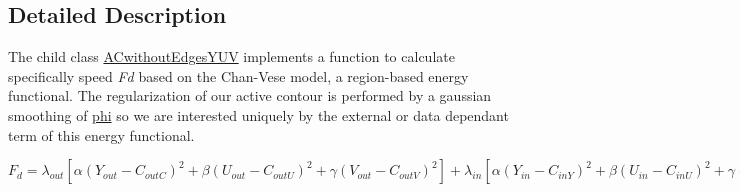 \subsection{Detailed Description}
The child class \hyperlink{classofeli_1_1_a_cwithout_edges_y_u_v}{A\-Cwithout\-Edges\-Y\-U\-V} implements a function to calculate specifically speed {\itshape Fd} based on the Chan-\/\-Vese model, a region-\/based energy functional. The regularization of our active contour is performed by a gaussian smoothing of \hyperlink{classofeli_1_1_active_contour_aacb03a6ded4ca51cb52f58aeff955ef7}{phi} so we are interested uniquely by the external or data dependant term of this energy functional.\par
 $F_{d}=\lambda _{out}\left[ \alpha \left( Y_{out}-C_{outC}\right) ^{2}+ \beta \left( U_{out}-C_{outU}\right) ^{2}+ \gamma \left( V_{out}-C_{outV}\right) ^{2}\right] + \lambda _{in}\left[ \alpha \left( Y_{in}-C_{inY}\right) ^{2}+ \beta \left( U_{in}-C_{inU}\right) ^{2}+ \gamma \left( V_{in}-C_{inV}\right) ^{2}\right]$

